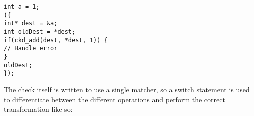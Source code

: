 \begin{center}
\parbox{0.8\linewidth}{
\texttt{int a = 1;\\
(\{\\
\hspace*{2em}int* dest = \&a;\\
\hspace*{2em}int oldDest = *dest;\\
\hspace*{2em}if(ckd\_add(dest, *dest, 1)) \{\\
\hspace*{4em}// Handle error\\
\hspace*{2em}\}\\
\hspace*{2em}oldDest;\\
\});}
}
\end{center}

The check itself is written to use a single matcher, so a switch statement is used to differentiate between the different operations and perform the correct transformation like so:

